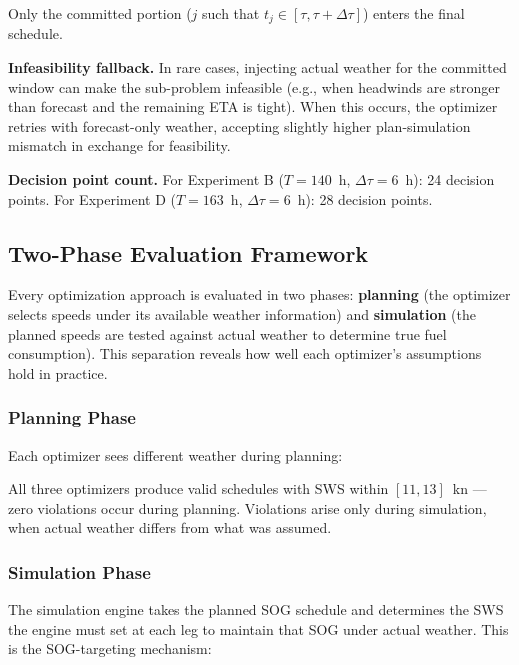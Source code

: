 \documentclass[review]{elsarticle}
\begin{document}
Only the committed portion ($j$ such that $t_j \in [\tau, \tau + \Delta\tau]$) enters the final schedule.

\textbf{Infeasibility fallback.} In rare cases, injecting actual weather for the committed window can make the sub-problem infeasible (e.g., when headwinds are stronger than forecast and the remaining ETA is tight). When this occurs, the optimizer retries with forecast-only weather, accepting slightly higher plan-simulation mismatch in exchange for feasibility.

\textbf{Decision point count.} For Experiment B ($T = 140$~h, $\Delta\tau = 6$~h): 24 decision points. For Experiment D ($T = 163$~h, $\Delta\tau = 6$~h): 28 decision points.

\subsection{Two-Phase Evaluation Framework}
\label{sec:two-phase}

Every optimization approach is evaluated in two phases: \textbf{planning} (the optimizer selects speeds under its available weather information) and \textbf{simulation} (the planned speeds are tested against actual weather to determine true fuel consumption). This separation reveals how well each optimizer's assumptions hold in practice.

\subsubsection{Planning Phase}

Each optimizer sees different weather during planning:


All three optimizers produce valid schedules with SWS within $[11, 13]$~kn --- zero violations occur during planning. Violations arise only during simulation, when actual weather differs from what was assumed.

\subsubsection{Simulation Phase}

The simulation engine takes the planned SOG schedule and determines the SWS the engine must set at each leg to maintain that SOG under actual weather. This is the SOG-targeting mechanism:
\end{document}
